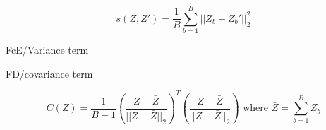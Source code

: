\documentclass[../../thesis.tex]{subfiles}
\begin{document}
\begin{equation}
    s(Z,Z') = \frac{1}{B} \sum_{b=1}^B || Z_b-Z_b'||_2^2
\end{equation}

FcE/Variance term



FD/covariance term

\begin{equation}
    C(Z) = \frac{1}{B-1} \left(\frac{Z-\bar{Z}}{||Z-\bar{Z}||_2}\right)^T\left(\frac{Z-\bar{Z}}{||Z-\bar{Z}||_2}\right) \text{ where }  \bar{Z} = \sum_{b=1}^B  Z_b
\end{equation}

\end{document}
